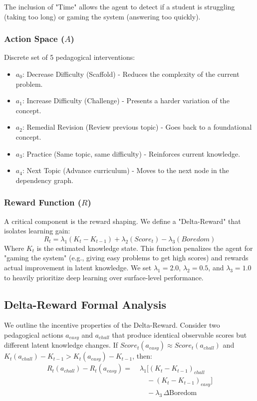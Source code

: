 \documentclass[conference]{IEEEtran}
\begin{document}
The inclusion of "Time" allows the agent to detect if a student is struggling (taking too long) or gaming the system (answering too quickly).

\subsubsection{Action Space ($A$)}
Discrete set of 5 pedagogical interventions:
\begin{itemize}
    \item $a_0$: Decrease Difficulty (Scaffold) - Reduces the complexity of the current problem.
    \item $a_1$: Increase Difficulty (Challenge) - Presents a harder variation of the concept.
    \item $a_2$: Remedial Revision (Review previous topic) - Goes back to a foundational concept.
    \item $a_3$: Practice (Same topic, same difficulty) - Reinforces current knowledge.
    \item $a_4$: Next Topic (Advance curriculum) - Moves to the next node in the dependency graph.
\end{itemize}

\subsubsection{Reward Function ($R$)}
A critical component is the reward shaping. We define a "Delta-Reward" that isolates learning gain:
\begin{equation}
R_t = \lambda_1 (K_t - K_{t-1}) + \lambda_2 (Score_t) - \lambda_3 (Boredom)
\end{equation}
Where $K_t$ is the estimated knowledge state. This function penalizes the agent for "gaming the system" (e.g., giving easy problems to get high scores) and rewards actual improvement in latent knowledge. We set $\lambda_1=2.0$, $\lambda_2=0.5$, and $\lambda_3=1.0$ to heavily prioritize deep learning over surface-level performance.

\subsection{Delta-Reward Formal Analysis}
We outline the incentive properties of the Delta-Reward. Consider two pedagogical actions $a_{easy}$ and $a_{chall}$ that produce identical observable scores but different latent knowledge changes. If $Score_t(a_{easy}) \approx Score_t(a_{chall})$ and $K_t(a_{chall}) - K_{t-1} > K_t(a_{easy}) - K_{t-1}$, then:
\begin{equation}
\begin{aligned}
R_t(a_{chall}) - R_t(a_{easy}) =\;& 
\lambda_1 \Big[
(K_t - K_{t-1})_{chall} \\
&\quad - (K_t - K_{t-1})_{easy}
\Big] \\
&\quad - \lambda_3 \, \Delta \text{Boredom}
\end{aligned}
\end{equation}
\end{document}
